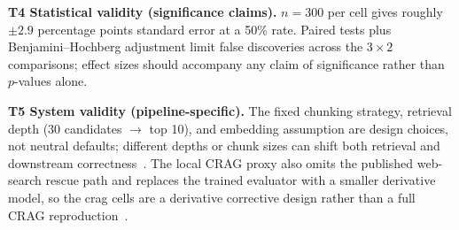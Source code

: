 \textbf{T4 Statistical validity (significance claims).}
$n=300$ per cell gives roughly $\pm 2.9$ percentage points standard
error at a 50\% rate. Paired tests plus Benjamini--Hochberg adjustment
limit false discoveries across the $3 \times 2$ comparisons; effect sizes
should accompany any claim of significance rather than $p$-values alone.

\textbf{T5 System validity (pipeline-specific).}
The fixed chunking strategy, retrieval depth (30 candidates $\rightarrow$
top 10), and embedding assumption are design choices, not neutral
defaults; different depths or chunk sizes can shift both retrieval and
downstream correctness~\cite{elkiran2026empirical}. The local CRAG
proxy also omits the published web-search rescue path and replaces the
trained evaluator with a smaller derivative model, so the crag cells are
a derivative corrective design rather than a full CRAG
reproduction~\cite{yan2024crag}.
